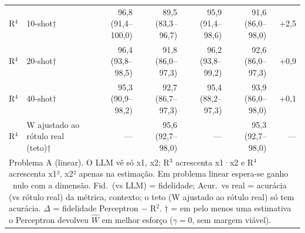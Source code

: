 \begin{table}[htbp]
\begin{tabular}{llrrrrr}
R$^4$ & 10-shot† & 96,8 (91,4–100,0) & 89,5 (83,3–96,7) & 95,9 (91,4–98,6) & 91,6 (86,0–98,0) & +2,5 \\
R$^4$ & 20-shot† & 96,4 (93,8–98,5) & 91,8 (86,0–97,3) & 96,2 (93,8–99,2) & 92,6 (86,0–97,3) & +0,9 \\
R$^4$ & 40-shot† & 95,3 (90,9–98,2) & 92,7 (86,7–97,3) & 95,4 (88,2–97,3) & 93,9 (86,0–98,0) & +0,1 \\
R$^4$ & W ajustado ao rótulo real (teto)† & — & 95,6 (92,7–98,0) & — & 95,3 (92,7–98,0) & — \\
\bottomrule
\multicolumn{7}{p{0.95\linewidth}}{\footnotesize Problema A (linear). O LLM vê só x1, x2; R$^3$ acrescenta x1·x2 e R$^4$ acrescenta x1², x2² apenas na estimação. Em problema linear espera-se ganho ~nulo com a dimensão. Fid.\ (vs LLM) = fidelidade; Acur.\ vs real = acurácia (vs rótulo real) da métrica, contexto; o teto (W ajustado ao rótulo real) só tem acurácia. $\Delta$ = fidelidade Perceptron $-$ R$^2$. † = em pelo menos uma estimativa o Perceptron devolveu $\hat{W}$ em melhor esforço ($\gamma = 0$, sem margem viável).} \\
\end{tabular}
\end{table}
